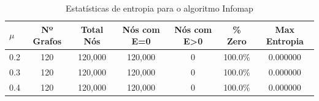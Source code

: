 \begin{table}[H]
\centering
\caption{Estatísticas de entropia para o algoritmo Infomap}
\label{tab:infomap_entropy}
\begin{tabular}{lcccccc}
\hline
\textbf{$\mu$} & \textbf{Nº Grafos} & \textbf{Total Nós} & \textbf{Nós com E=0} & \textbf{Nós com E>0} & \textbf{\% Zero} & \textbf{Max Entropia} \\
\hline
0.2 & 120 & 120,000 & 120,000 & 0 & 100.0\% & 0.000000 \\
0.3 & 120 & 120,000 & 120,000 & 0 & 100.0\% & 0.000000 \\
0.4 & 120 & 120,000 & 120,000 & 0 & 100.0\% & 0.000000 \\
\hline
\end{tabular}
\end{table}